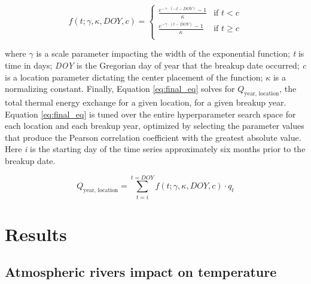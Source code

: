 \documentclass[12pts,draft]{AR_analysis_}
\begin{document}
\begin{equation}
	\label{eq:cases}
	f(t; \gamma, \kappa, DOY, c) =
	\begin{cases}
    	\frac{e^{-\gamma \cdot (-t - DOY)} - 1}{\kappa} & \text{if }
        	t < c \\
    	\frac{e^{-\gamma \cdot (t - DOY)} - 1}{\kappa} & \text{if }
        	t \geq c \\
	\end{cases}
\end{equation}

\noindent where $\gamma$ is a scale parameter impacting the width of
the exponential function; \emph{t} is time in days; 
\emph{DOY} is the Gregorian day of year
that the breakup date occurred; 
\emph{c} is a location parameter dictating the
center placement of the function; $\kappa$ is a normalizing constant.
Finally, Equation \ref{eq:final_eq} solves for $Q_{\text{year, location}}$,
the total thermal 
energy exchange for a given location, for a given breakup year.
Equation \ref{eq:final_eq} is tuned over the entire 
hyperparameter search space for each
location and each breakup year, optimized by selecting the 
parameter values that produce 
the Pearson correlation coefficient with the greatest absolute value. 
Here \emph{i} is the starting day of the time series approximately 
six months prior to the breakup date. 

\begin{equation}
\label{eq:final_eq}
	Q_{\text{year, location}} = \sum_{t=i}^{t=DOY} f(t; \gamma, \kappa, DOY, c) \cdot q_{t}
\end{equation}


\section{Results} 

\subsection{Atmospheric rivers impact on temperature}
\end{document}
